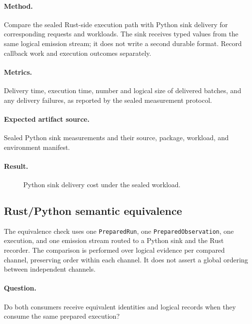 \paragraph{Method.} Compare the sealed Rust-side execution path with Python
sink delivery for corresponding requests and workloads. The sink receives
typed values from the same logical emission stream; it does not write a
second durable format. Record callback work and execution outcomes separately.

\paragraph{Metrics.} Delivery time, execution time, number and logical size
of delivered batches, and any delivery failures, as reported by the sealed
measurement protocol.

\paragraph{Expected artifact source.} Sealed Python sink measurements and
their source, package, workload, and environment manifest.

\paragraph{Result.} \TBAPythonSinkResult

\begin{figure}[t]
  \centering
  \PaperPlaceholderFigure{2.4cm}{\TBAPythonFigure}
  \caption{Python sink delivery cost under the sealed workload.
  \TBAPythonCaption}
  \label{fig:python-sink-cost}
\end{figure}

\subsection{Rust/Python semantic equivalence}
\label{sec:equivalence}

The equivalence check uses one \texttt{PreparedRun}, one
\texttt{PreparedObservation}, one execution, and one emission stream routed
to a Python sink and the Rust recorder. The comparison is performed over
logical evidence per compared channel, preserving order within each channel.
It does not assert a global ordering between independent channels.

\paragraph{Question.} Do both consumers receive equivalent identities and
logical records when they consume the same prepared execution?

